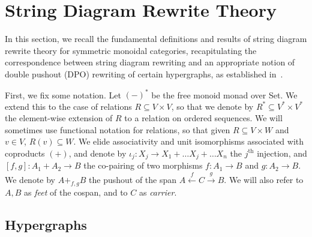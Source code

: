 \section{String Diagram Rewrite Theory}\label{sec:combinatorial-semantics}

In this section,  we recall the fundamental definitions and results of string diagram rewrite theory for symmetric monoidal categories,  recapitulating the correspondence between string diagram rewriting and an appropriate notion of double pushout (DPO) rewriting of certain hypergraphs,  as established in~\cite{bonchi_string_2022-1, bonchi_string_2022-2}.  

First,  we fix some notation.  Let $(-)^*$ be the free monoid monad over \textsf{Set}.  
We extend this to the case of relations $R \subseteq V \times V$,  so that we denote by $R^{*} \subseteq V^* \times V^*$ the element-wise extension of $R$ to a relation on ordered sequences. 
We will sometimes use functional notation for relations,  so that given $R \subseteq V \times W$ and $v \in V$,  $R(v) \subseteq W$. 
We elide associativity and unit isomorphisms associated with coproducts $(+)$,  and denote by $\iota_j: X_{j} \rightarrow X_{1} + \ldots X_{j} + \ldots X_{n}$ the $j^{\text{th}}$ injection,  and $[f,g]: A_1 + A_2 \to B$ the co-pairing of two morphisms $f: A_1 \to B$ and $g:A_2 \to B$. 
We denote by $A +_{f,g} B$ the pushout of the span $A \xleftarrow{f} C \xrightarrow{g} B$.
We will also refer to $A,B$ as \textit{feet} of the cospan, and to $C$ as \textit{carrier}.

\subsection{Hypergraphs}


